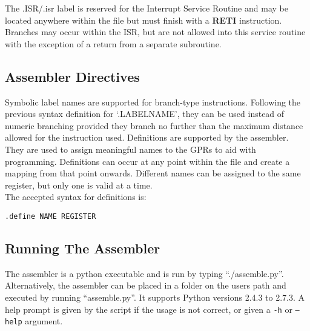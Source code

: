  The .ISR/.isr label is reserved for the Interrupt Service Routine and may be located anywhere within the file but must finish with a \textbf{RETI} instruction. 
Branches may occur within the ISR, but are not allowed into this service routine with the exception of a return from a separate subroutine. 

\subsection{Assembler Directives}
Symbolic label names are supported for branch-type instructions. Following the previous syntax definition for `.LABELNAME', they can be used instead of numeric branching provided they branch no further than the maximum distance allowed for the instruction used. 
Definitions are supported by the assembler. 
They are used to assign meaningful names to the GPRs to aid with programming.
Definitions can occur at any point within the file and create a mapping from that point onwards. 
Different names can be assigned to the same register, but only one is valid at a time. \\


 The accepted syntax for definitions is:

\begin{center}\texttt{.define NAME REGISTER}\end{center}

\subsection{Running The Assembler}\label{sect:runningassembler}

The assembler is a python executable and is run by typing ``./assemble.py''. 
Alternatively, the assembler can be placed in a folder on the users path and executed by running ``assemble.py''.
It supports Python versions 2.4.3 to 2.7.3.
A help prompt is given by the script if the usage is not correct, or given a \texttt{-h} or \texttt{--help} argument. 

